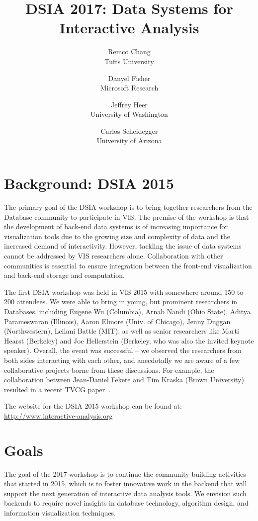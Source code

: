 \documentclass[journal]{vgtc}                %
\title{DSIA 2017: Data Systems for Interactive Analysis}
\author{Remco Chang\\
	\scriptsize Tufts University 
	\and Danyel Fisher\\
	\scriptsize Microsoft Research 
	\and Jeffrey Heer\\
	\scriptsize University of Washington
 	\and Carlos Scheidegger\\
 	\scriptsize University of Arizona}
\begin{document}
\maketitle
\section{Background: DSIA 2015}
The primary goal of the DSIA workshop is to bring together researchers from the Database community to participate in VIS.  
The premise of the workshop is that the development of back-end data systems is of increasing importance for visualization tools due to the growing size and complexity of data and the increased demand of interactivity. 
However, tackling the issue of data systems cannot be addressed by VIS researchers alone. 
Collaboration with other communities is essential to ensure integration between the front-end visualization and back-end storage and computation.

The first DSIA workshop was held in VIS 2015 with somewhere around 150 to 200 attendees. 
We were able to bring in young, but prominent researchers in Databases, including Eugene Wu (Columbia), Arnab Nandi (Ohio State), Aditya Parameswaran (Illinois), Aaron Elmore (Univ. of Chicago), Jenny Duggan (Northwestern), Leilani Battle (MIT); as well as senior researchers like Marti Hearst (Berkeley) and Joe Hellerstein (Berkeley, who was also the invited keynote speaker). 
Overall, the event was successful -- we observed the researchers from both sides interacting with each other, and anecdotally we are aware of a few collaborative projects borne from these discussions. 
For example, the collaboration between Jean-Daniel Fekete and Tim Kraska (Brown University) resulted in a recent TVCG paper~\cite{zgraggen2016progressive}.

The website for the DSIA 2015 workshop can be found at: \url{http://www.interactive-analysis.org}


\section{Goals}
The goal of the 2017 workshop is to continue the community-building activities that started in 2015, which is to foster innovative work in the backend that will support the next generation of interactive data analysis tools. 
We envision such backends to require novel insights in database technology, algorithm design, and information visualization techniques.
\end{document}
